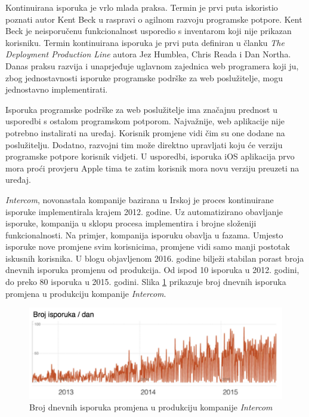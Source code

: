 \documentclass[times, utf8, diplomski, numeric]{fer}
\begin{document}
Kontinuirana isporuka je vrlo mlada praksa. Termin je prvi puta iskoristio poznati autor Kent Beck u raspravi o agilnom razvoju programske potpore. Kent Beck je neisporučenu funkcionalnost usporedio s inventarom koji nije prikazan korisniku. Termin kontinuirana isporuka je prvi puta definiran u članku \textit{The Deployment Production Line} autora Jez Humblea, Chris Reada i Dan Northa\citep{mics:DPT}. Danas praksu razvija i unaprjeđuje uglavnom zajednica web programera koji ju, zbog jednostavnosti isporuke programske podrške za web poslužitelje, mogu jednostavno implementirati.

Isporuka programske podrške za web poslužitelje ima značajnu prednost u usporedbi s ostalom programskom potporom. Najvažnije, web aplikacije nije potrebno instalirati na uređaj. Korisnik promjene vidi čim su one dodane na poslužitelju. Dodatno, razvojni tim može direktno upravljati koju će verziju programske potpore korisnik vidjeti. U usporedbi, isporuka iOS aplikacija prvo mora proći provjeru Apple tima te zatim korisnik mora novu verziju preuzeti na uređaj.

\textit{Intercom}, novonastala kompanije bazirana u Irskoj je proces kontinuirane isporuke implementirala krajem 2012. godine. Uz automatizirano obavljanje isporuke, kompanija u sklopu procesa implementira i brojne složeniji funkcionalnosti. Na primjer, kompanija isporuku obavlja u fazama. Umjesto isporuke nove promjene svim korisnicima, promjene vidi samo manji postotak iskusnih korisnika. U blogu objavljenom 2016. godine bilježi stabilan porast broja dnevnih isporuka promjenu od produkcija. Od ispod 10 isporuka u 2012. godini, do preko 80 isporuka u 2015. godini. Slika \ref{fig:IntercomShipsPerDay} prikazuje broj dnevnih isporuka promjena u produkciju kompanije \textit{Intercom}\citep{intercom:cd}.

\begin{figure}
\centering
\includegraphics[scale=0.7]{IntercomShipsPerDay}
\caption{Broj dnevnih isporuka promjena u produkciju kompanije \textit{Intercom}}
\label{fig:IntercomShipsPerDay}
\end{figure}
\end{document}
